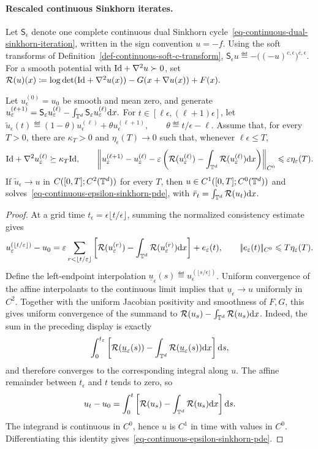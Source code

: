 \paragraph{Rescaled continuous Sinkhorn iterates.}
Let $\mathsf S_\epsilon$ denote one complete continuous dual Sinkhorn cycle~\eqref{eq-continuous-dual-sinkhorn-iteration}, written in the sign convention $u=-f$. Using the soft transforms of Definition~\ref{def-continuous-soft-c-transform},
\(\mathsf S_\epsilon u \eqdef -\Big((-u)^{c,\epsilon}\Big)^{\bar c,\epsilon}.\)
For a smooth potential with $\mathrm{Id}+\nabla^2u\succ0$, set
\(\mathcal R(u)(x) \coloneqq \log\det(\mathrm{Id}+\nabla^2u(x)) -G(x+\nabla u(x))+F(x).\)
\begin{prop}\label{prop-scaled-log-sinkhorn-limit}
Let $u_\epsilon^{(0)}=u_0$ be smooth and mean zero, and generate
\(u_\varepsilon^{(\ell+1)} = \mathsf S_\varepsilon u_\varepsilon^{(\ell)} - \int_{\mathbb{T}^d}\mathsf S_\varepsilon u_\varepsilon^{(\ell)}\mathrm{d} x.\)
For $t\in[\ell\epsilon,(\ell+1)\epsilon]$, let
\(\widetilde u_\epsilon(t) \eqdef (1-\theta)u_\epsilon^{(\ell)} +\theta u_\epsilon^{(\ell+1)}, \qquad \theta\eqdef t/\epsilon-\ell.\)
Assume that, for every $T>0$, there are $\kappa_T>0$ and $\eta_\epsilon(T)\to0$ such that, whenever $\ell\epsilon\leq T$,
\[
\mathrm{Id}+\nabla^2u_\varepsilon^{(\ell)}\succeq\kappa_T\mathrm{Id},
\qquad
\left\|
u_\varepsilon^{(\ell+1)}-u_\varepsilon^{(\ell)}
-\varepsilon\left(
\mathcal R(u_\varepsilon^{(\ell)})
-\int_{\mathbb{T}^d}\mathcal R(u_\varepsilon^{(\ell)})\mathrm{d} x
\right)
\right\|_{C^0}
\leqslant
\varepsilon\eta_\varepsilon(T).
\]
If $\widetilde u_\epsilon\to u$ in $C([0,T];C^2(\mathbb{T}^d))$ for every $T$, then $u\in C^1([0,T];C^0(\mathbb{T}^d))$ and solves~\eqref{eq-continuous-epsilon-sinkhorn-pde}, with
\(
\bar r_t=\int_{\mathbb{T}^d}\mathcal R(u_t)\mathrm{d} x
\).
\end{prop}
\begin{proof}
At a grid time $t_\epsilon=\epsilon\lfloor t/\epsilon\rfloor$, summing the normalized consistency estimate gives
\[
u_\varepsilon^{(\lfloor t/\varepsilon\rfloor)}-u_0
=
\varepsilon\sum_{r<\lfloor t/\varepsilon\rfloor}
\left[
\mathcal R(u_\varepsilon^{(r)})
-\int_{\mathbb{T}^d}\mathcal R(u_\varepsilon^{(r)})\mathrm{d} x
\right]
+e_\varepsilon(t),
\qquad
|\!| e_\varepsilon(t) |\!|_{C^0}\leqslant T\eta_\varepsilon(T).
\]
Define the left-endpoint interpolation $\underline u_\epsilon(s)\eqdef u_\epsilon^{(\lfloor s/\epsilon\rfloor)}$. Uniform convergence of the affine interpolants to the continuous limit implies that $\underline u_\epsilon\to u$ uniformly in $C^2$. Together with the uniform Jacobian positivity and smoothness of $F,G$, this gives uniform convergence of the summand to
\(
\mathcal R(u_s)-\int_{\mathbb{T}^d}\mathcal R(u_s)\mathrm{d} x
\).
Indeed, the sum in the preceding display is exactly
\[
\int_0^{t_\varepsilon}
\left[
\mathcal R(\underline u_\varepsilon(s))
-\int_{\mathbb{T}^d}\mathcal R(\underline u_\varepsilon(s))\mathrm{d} x
\right]\mathrm{d} s,
\]
and therefore converges to the corresponding integral along $u$. The affine remainder between $t_\epsilon$ and $t$ tends to zero, so
\[
u_t-u_0
=
\int_0^t
\left[
\mathcal R(u_s)-\int_{\mathbb{T}^d}\mathcal R(u_s)\mathrm{d} x
\right]\mathrm{d} s.
\]
The integrand is continuous in $C^0$, hence $u$ is $C^1$ in time with values in $C^0$. Differentiating this identity gives~\eqref{eq-continuous-epsilon-sinkhorn-pde}.
\end{proof}

